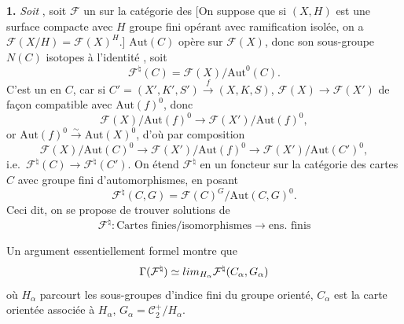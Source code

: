 \documentclass[11pt,a4paper]{article}
\begin{document}
\textbf{1.} 
\emph{Soit} , soit $\mathcal{F}$ un   sur
la catégorie des     [On suppose que
si $(X, H)$ est une surface compacte avec $H$ groupe fini opérant avec ramification isolée, on a
$\mathcal{F}(X/H) = \mathcal{F}(X)^{H}$.]
$\mathrm{Aut}(C)$ opère sur $\mathcal{F}(X)$, donc  son sous-groupe
$N(C)$   isotopes à l'identité
, soit
\[
  \mathcal{F}^{\natural}(C) = \mathcal{F}(X)/\mathrm{Aut}^{0}(C).
\]
C'est un   en $C$, car si
$C' = (X', K', S') \xrightarrow{\;f\;} (X, K, S)$, 
$\mathcal{F}(X) \to \mathcal{F}(X')$ 
de façon compatible avec $\mathrm{Aut}(f)^{0}$, donc
\[
  \mathcal{F}(X)/\mathrm{Aut}(f)^{0} \longrightarrow \mathcal{F}(X')/\mathrm{Aut}(f)^{0},
\]
or $\mathrm{Aut}(f)^{0} \xrightarrow{\sim} \mathrm{Aut}(X)^{0}$, d'où par composition
\[
  \mathcal{F}(X)/\mathrm{Aut}(C)^{0} \to \mathcal{F}(X')/\mathrm{Aut}(f)^{0}
  \to \mathcal{F}(X')/\mathrm{Aut}(C')^{0},
\]
i.e.\ $\mathcal{F}^{\natural}(C) \to \mathcal{F}^{\natural}(C')$.
On étend $\mathcal{F}^{\natural}$ en un foncteur sur la catégorie des cartes  $C$ avec
groupe fini d'automorphismes, en posant
\[
  \mathcal{F}^{\natural}(C, G) = \mathcal{F}(C)^{G}/\mathrm{Aut}(C, G)^{0}.
\]
Ceci dit, on se propose de trouver \struck{\ill{}}  solutions de 
\[
  \mathcal{F}^{\natural} : \text{Cartes finies}/\text{isomorphismes} \longrightarrow \text{ens.\ finis}
\]

Un argument essentiellement formel montre que
\[
  \Gamma(\mathcal{F}^{\natural}) \simeq \varinjlim_{H_\alpha} \mathcal{F}^{\natural}(C_\alpha, G_\alpha)
\]
 où $H_\alpha$ parcourt les sous-groupes \emph{} d'indice fini du groupe
 orienté, $C_\alpha$ est la carte orientée associée à $H_\alpha$, $G_\alpha = \mathcal{C}_2^{+}/H_\alpha$.
\end{document}
